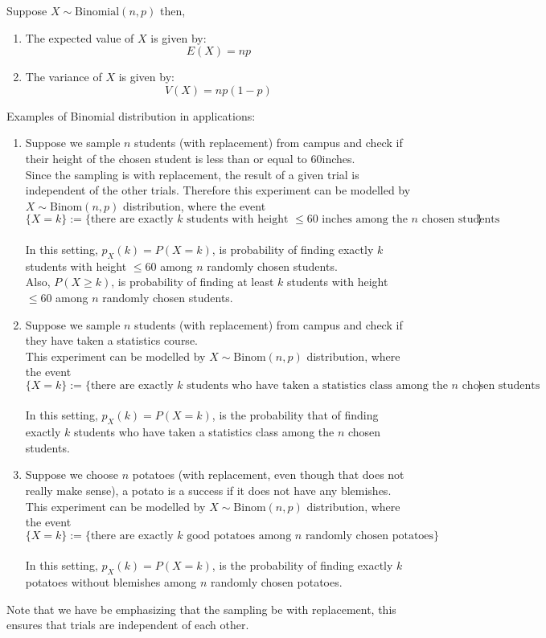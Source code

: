 \begin{thm}
    Suppose $X\sim \text{Binomial}(n, p)$ then,
    \begin{enumerate}
        \item The expected value of $X$ is given by:
        $$E(X) = np$$
        \item The variance of $X$ is given by:
        $$V(X) = np(1-p)$$
    \end{enumerate}
\end{thm}
Examples of Binomial distribution in applications:
\begin{enumerate}
    \item Suppose we sample $n$ students (with replacement) from campus and check if their height of the chosen student is less than or equal to 60inches. 
    \\
    Since the sampling is with replacement, the result of a given trial is independent of the other trials. Therefore this experiment can be modelled by $X\sim \text{Binom}(n, p)$ distribution, where the event 
    $$\{X= k \} := \{\text{there are exactly $k$ students with height $\le 60$ inches among the $n$ chosen students}\}$$
    \\
    In this setting, $p_X(k) = P(X=k)$, is probability of finding exactly $k$ students with height $\le 60$ among $n$ randomly chosen students. 
    \\
    Also, $P(X \ge k)$, is probability of finding at least  $k$ students with height $\le 60$ among $n$ randomly chosen students. 
    \item  Suppose we sample $n$ students (with replacement) from campus and check if they have taken a statistics course. 
    \\
    This experiment can be modelled by $X\sim \text{Binom}(n, p)$ distribution, where the event 
    $$\{X=k\} := \{\text{there are exactly $k$ students who have taken a statistics class among the $n$ chosen students}\}$$
    \\
    In this setting, $p_X(k) = P(X=k)$, is the probability that of finding exactly $k$ students who have taken a statistics class among the $n$ chosen students. 
    
    \item  Suppose we choose $n$ potatoes (with replacement, even though that does not really make sense), a potato is a success if it does not have any blemishes. 
    \\
    This experiment can be modelled by $X\sim \text{Binom}(n, p)$ distribution, where the event 
    $$\{X=k\} := \{\text{there are exactly $k$ good potatoes among $n$ randomly chosen potatoes}\}$$
    \\
    In this setting, $p_X(k) = P(X=k)$, is the probability of finding exactly $k$ potatoes without blemishes among $n$ randomly chosen potatoes. 
\end{enumerate}
Note that we have be emphasizing that the sampling be with replacement, this ensures that trials are independent of each other.
\\

